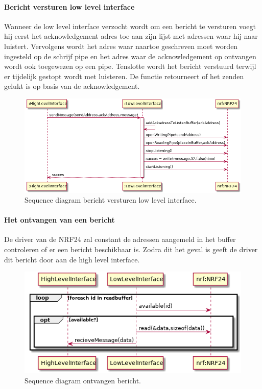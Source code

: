 \documentclass[a4paper, 11pt, oneside]{report}
\begin{document}
\paragraph{Bericht versturen low level interface}
\label{DetailedDesign:NRF24:sequence:lowlevelSendMessage}
Wanneer de low level interface verzocht wordt om een bericht te versturen voegt hij eerst het acknowledgement adres toe aan zijn lijst met adressen waar hij naar luistert. 
Vervolgens wordt het adres waar naartoe geschreven moet worden ingesteld op de schrijf pipe en het adres waar de acknowledgement op ontvangen wordt ook toegewezen op een pipe.
Tenslotte wordt het bericht verstuurd terwijl er tijdelijk gestopt wordt met luisteren.
De functie retourneert of het zenden gelukt is op basis van de acknowledgement.    
\begin{figure}[H]
	\begin{center}\includegraphics[width=1\linewidth]{UML/out/NRF24/sequence/lowlevelSendMessage/lowlevelSendMessage.png}\end{center}
	\caption{Sequence diagram bericht versturen low level interface.}
	\label{fig:NRF24:sequence:lowlevelSendMessage}
\end{figure}

\paragraph{Het ontvangen van een bericht}
\label{DetailedDesign:NRF24:sequence:recieveMessage}

De driver van de NRF24 zal constant de adressen aangemeld in het buffer controleren of er een bericht beschikbaar is. 
Zodra dit het geval is geeft de driver dit bericht door aan de high level interface.

\begin{figure}[H]
	\begin{center}\includegraphics[width=.6\linewidth]{UML/out/NRF24/sequence/recieveMessage/recieveMessage.png}\end{center}
	\caption{Sequence diagram ontvangen bericht.}
	\label{fig:NRF24:sequence:recieveMessage}
\end{figure}
\end{document}
